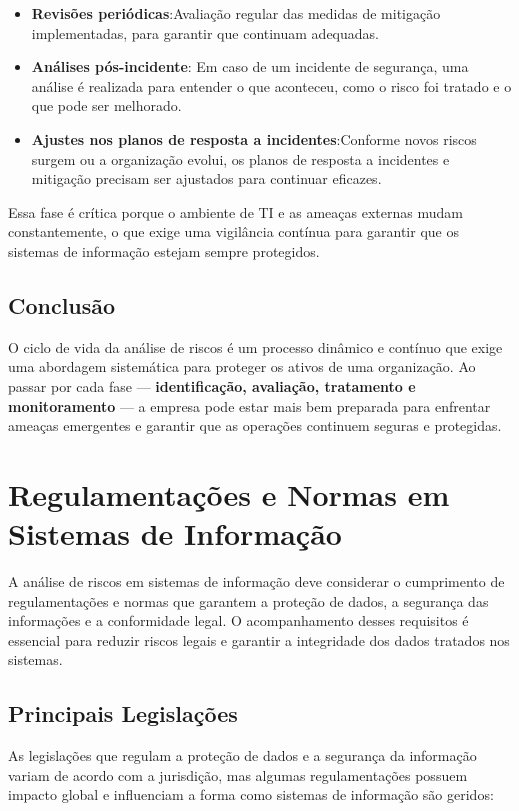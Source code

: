 \documentclass[12pt,oneside,a4paper,article]{abntex2}
\begin{document}
\begin{itemize}
\item \textbf{Revisões periódicas}:Avaliação regular das medidas de mitigação implementadas, para garantir que continuam adequadas.
    \item \textbf{Análises pós-incidente}: Em caso de um incidente de segurança, uma análise é realizada para entender o que aconteceu, como o risco foi tratado e o que pode ser melhorado.
    \item \textbf{Ajustes nos planos de resposta a incidentes}:Conforme novos riscos surgem ou a organização evolui, os planos de resposta a incidentes e mitigação precisam ser ajustados para continuar eficazes.
\end{itemize}

{Essa fase é crítica porque o ambiente de TI e as ameaças externas mudam constantemente, o que exige uma vigilância contínua para garantir que os sistemas de informação estejam sempre protegidos.}

\subsection{Conclusão}
{O ciclo de vida da análise de riscos é um processo dinâmico e contínuo que exige uma abordagem sistemática para proteger os ativos de uma organização. Ao passar por cada fase — \textbf{identificação, avaliação, tratamento e monitoramento} — a empresa pode estar mais bem preparada para enfrentar ameaças emergentes e garantir que as operações continuem seguras e protegidas.}




\section{\textbf{Regulamentações e Normas em Sistemas de Informação}}

A análise de riscos em sistemas de informação deve considerar o cumprimento de regulamentações e normas que garantem a proteção de dados, a segurança das informações e a conformidade legal. O acompanhamento desses requisitos é essencial para reduzir riscos legais e garantir a integridade dos dados tratados nos sistemas.

\subsection{Principais Legislações}

As legislações que regulam a proteção de dados e a segurança da informação variam de acordo com a jurisdição, mas algumas regulamentações possuem impacto global e influenciam a forma como sistemas de informação são geridos:
\end{document}
